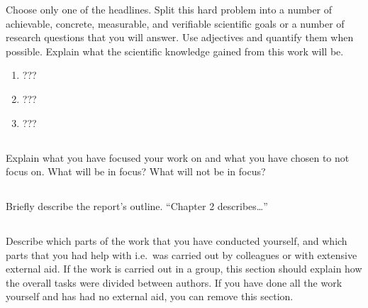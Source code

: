 Choose only one of the headlines. Split this hard problem into a number of achievable, concrete,
measurable, and verifiable scientific goals or a number of research questions that you will answer.
Use adjectives and quantify them when possible. Explain what the scientific knowledge gained from
this work will be.

\begin{enumerate}
  \item {???}
  \item {???}
  \item {???}
\end{enumerate}

\subsection{}\label{subsec:scope}
\noindent
Explain what you have focused your work on and what you have chosen to not focus
on. What will be in focus? What will not be in focus?

\subsection{}\label{subsec:outline}
\noindent
Briefly describe the report's outline. ``Chapter 2 describes\dots''

\subsection{}\label{subsec:contributions}
\noindent 
Describe which parts of the work that you have conducted yourself, and which parts that you had help
with i.e.\ was carried out by colleagues or with extensive external aid. If the work is carried out
in a group, this section should explain how the overall tasks were divided between authors. If you
have done all the work yourself and has had no external aid, you can remove this section.
